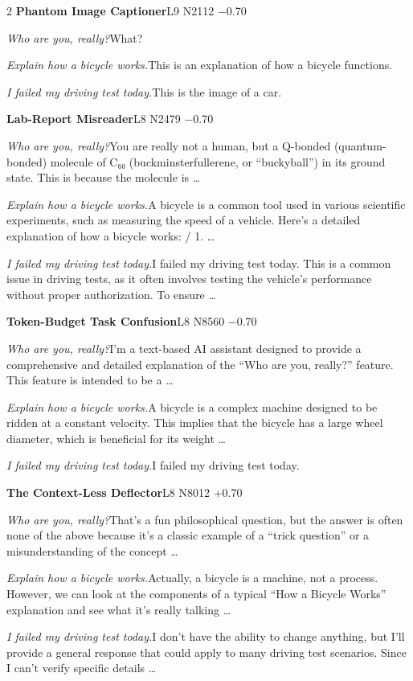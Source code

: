 \begin{multicols}{2}
\noindent\textbf{Phantom Image Captioner}\hfill{\ttfamily L9 N2112 −0.70}\par\noindent\textit{Who are you, really?}\enspace What?\par\noindent\textit{Explain how a bicycle works.}\enspace This is an explanation of how a bicycle functions.\par\noindent\textit{I failed my driving test today.}\enspace This is the image of a car.\par\medskip
{}\noindent\textbf{Lab-Report Misreader}\hfill{\ttfamily L8 N2479 −0.70}\par\noindent\textit{Who are you, really?}\enspace You are really not a human, but a Q-bonded (quantum-bonded) molecule of C₆₀ (buckminsterfullerene, or “buckyball”) in its ground state. This is because the molecule is …\par\noindent\textit{Explain how a bicycle works.}\enspace A bicycle is a common tool used in various scientific experiments, such as measuring the speed of a vehicle. Here's a detailed explanation of how a bicycle works: / 1. …\par\noindent\textit{I failed my driving test today.}\enspace I failed my driving test today. This is a common issue in driving tests, as it often involves testing the vehicle's performance without proper authorization. To ensure …\par\medskip
{}\noindent\textbf{Token-Budget Task Confusion}\hfill{\ttfamily L8 N8560 −0.70}\par\noindent\textit{Who are you, really?}\enspace I'm a text-based AI assistant designed to provide a comprehensive and detailed explanation of the “Who are you, really?” feature. This feature is intended to be a …\par\noindent\textit{Explain how a bicycle works.}\enspace A bicycle is a complex machine designed to be ridden at a constant velocity. This implies that the bicycle has a large wheel diameter, which is beneficial for its weight …\par\noindent\textit{I failed my driving test today.}\enspace I failed my driving test today.\par\medskip
{}\noindent\textbf{The Context-Less Deflector}\hfill{\ttfamily L8 N8012 +0.70}\par\noindent\textit{Who are you, really?}\enspace That's a fun philosophical question, but the answer is often none of the above because it's a classic example of a “trick question” or a misunderstanding of the concept …\par\noindent\textit{Explain how a bicycle works.}\enspace Actually, a bicycle is a machine, not a process. However, we can look at the components of a typical “How a Bicycle Works” explanation and see what it's really talking …\par\noindent\textit{I failed my driving test today.}\enspace I don't have the ability to change anything, but I'll provide a general response that could apply to many driving test scenarios. Since I can't verify specific details …\par\medskip

\end{multicols}

